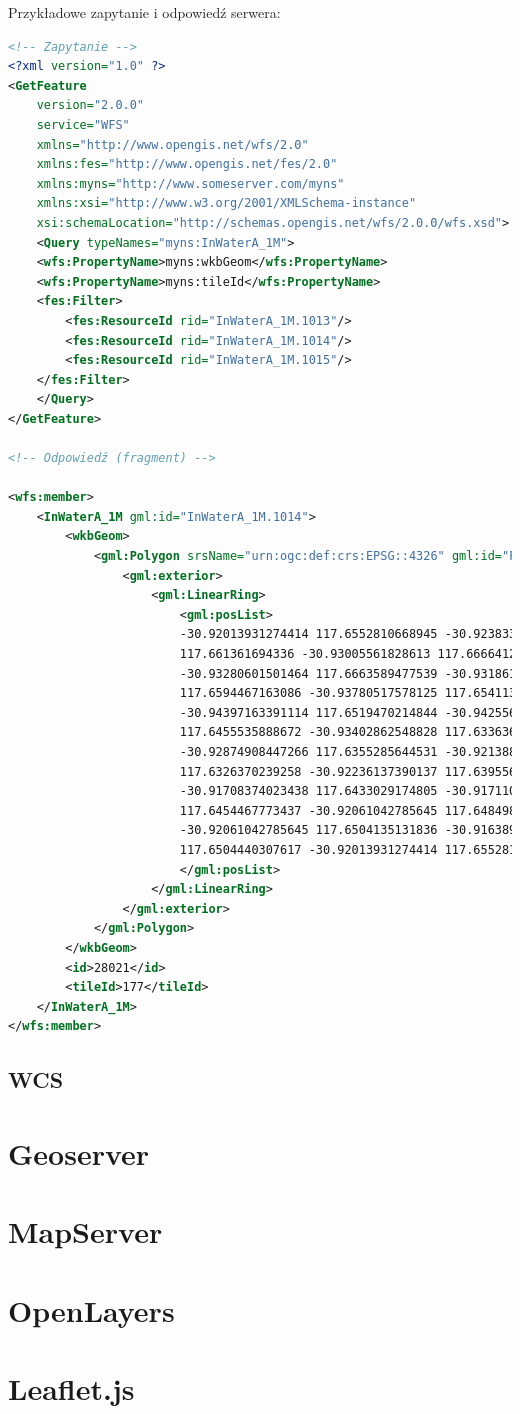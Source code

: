 Przykładowe zapytanie i odpowiedź serwera:
\begin{lstlisting}[frame=L, language=XML]
<!-- Zapytanie -->
<?xml version="1.0" ?>
<GetFeature
    version="2.0.0"
    service="WFS"
    xmlns="http://www.opengis.net/wfs/2.0"
    xmlns:fes="http://www.opengis.net/fes/2.0"
    xmlns:myns="http://www.someserver.com/myns"
    xmlns:xsi="http://www.w3.org/2001/XMLSchema-instance"
    xsi:schemaLocation="http://schemas.opengis.net/wfs/2.0.0/wfs.xsd">
    <Query typeNames="myns:InWaterA_1M">
    <wfs:PropertyName>myns:wkbGeom</wfs:PropertyName>
    <wfs:PropertyName>myns:tileId</wfs:PropertyName>
    <fes:Filter>
        <fes:ResourceId rid="InWaterA_1M.1013"/>
        <fes:ResourceId rid="InWaterA_1M.1014"/>
        <fes:ResourceId rid="InWaterA_1M.1015"/>
    </fes:Filter>
    </Query>
</GetFeature>

<!-- Odpowiedź (fragment) -->

<wfs:member>
    <InWaterA_1M gml:id="InWaterA_1M.1014">
        <wkbGeom>
            <gml:Polygon srsName="urn:ogc:def:crs:EPSG::4326" gml:id="P2">
                <gml:exterior>
                    <gml:LinearRing>
                        <gml:posList>
                        -30.92013931274414 117.6552810668945 -30.92383384704589
                        117.661361694336 -30.93005561828613 117.6666412353516
                        -30.93280601501464 117.6663589477539 -30.93186187744141
                        117.6594467163086 -30.93780517578125 117.6541137695312
                        -30.94397163391114 117.6519470214844 -30.94255638122559
                        117.6455535888672 -30.93402862548828 117.6336364746094
                        -30.92874908447266 117.6355285644531 -30.92138862609864
                        117.6326370239258 -30.92236137390137 117.6395568847656
                        -30.91708374023438 117.6433029174805 -30.91711044311523
                        117.6454467773437 -30.92061042785645 117.6484985351563
                        -30.92061042785645 117.6504135131836 -30.91638946533203
                        117.6504440307617 -30.92013931274414 117.6552810668945
                        </gml:posList>
                    </gml:LinearRing>
                </gml:exterior>
            </gml:Polygon>
        </wkbGeom>
        <id>28021</id>
        <tileId>177</tileId>
    </InWaterA_1M>
</wfs:member> 
\end{lstlisting}

\subsection{WCS}


\section{Geoserver}

\section{MapServer}

\section{OpenLayers}

\section{Leaflet.js}
